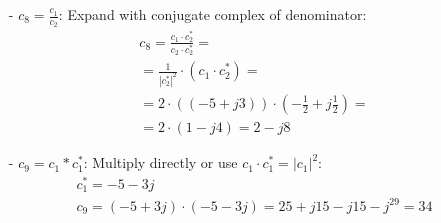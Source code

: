 \begin{enumerate}
\item[-]
$c_8 = \frac{c_1}{c_2}$: Expand with conjugate complex of denominator:
\[
\begin{aligned}
& c_8 = \frac{c_1\cdot c_2^*}{c_2 \cdot c_2^*} = \\
& = \frac{1}{|c_2^*|^2} \cdot (c_1 \cdot c_2^*) = \\
& = 2 \cdot ((-5+j 3)) \cdot (-\frac{1}{2} + j \frac{1}{2}) = \\
& = 2 \cdot (1 - j4) = 2 - j8
\end{aligned}
\]
\end{enumerate}

\begin{enumerate}
\item[-]
$c_9 = c_1 * c_1^*$: Multiply directly or use $c_1 \cdot c_1^* = |c_1|^2$:
\[
\begin{aligned}
& c_1^* = -5 - 3j \\
& c_9 = (-5 + 3j) \cdot (-5 - 3j) = 25 + j15 -j15 -j^29 = 34
\end{aligned}
\]
\end{enumerate}
